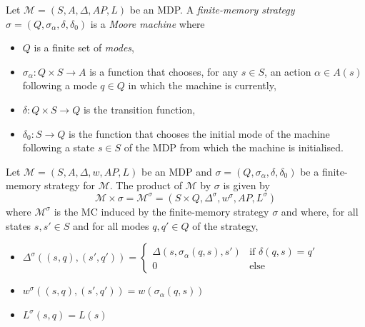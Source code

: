 \begin{definition}
Let $\mathcal{M} = (S, A, \Delta, AP, L)$ be an MDP.
A \textit{finite-memory strategy} $\sigma = (Q, \sigma_\alpha, \delta, \delta_0)$ is a \textit{Moore machine} where
\begin{itemize}
	\item $Q$ is a finite set of \textit{modes},
	\item $\sigma_\alpha: Q \times S \rightarrow A$ is a function that chooses, for any $s \in S$, an action $\alpha \in A(s)$ following a mode $q \in Q$ in which the machine is currently,
	\item $\delta: Q \times S \rightarrow Q$ is the transition function,
	\item $\delta_0: S \rightarrow Q$ is the function that chooses the initial mode of the machine following a state $s \in S$ of the MDP from which the machine is initialised.
\end{itemize}
\end{definition}

\begin{definition}
Let $\mathcal{M} = (S, A, \Delta, w, AP, L)$ be an MDP and $\sigma = (Q, \sigma_\alpha, \delta, \delta_0)$ be a finite-memory strategy for $\mathcal{M}$.
The product of $\mathcal{M}$ by $\sigma$ is given by
\[ \mathcal{M} \times \sigma = \mathcal{M}^\sigma = (S \times Q, \Delta^\sigma, w^\sigma, AP, L^\sigma) \]
where $\mathcal{M}^\sigma$ is the MC induced by the finite-memory strategy $\sigma$ and where,
for all states $s, s' \in S$ and for all modes $q, q' \in Q$ of the strategy,
\begin{itemize}
	\item $\Delta^\sigma((s, q), (s', q')) =
	\begin{cases}
	\Delta(s, \sigma_\alpha(q, s), s') & \text{if } \delta(q, s) = q'\\
	0  & \text{else}
	\end{cases}$
  \item $w^\sigma((s, q), (s', q')) = w(\sigma_\alpha(q, s))$
  \item $L^\sigma(s, q) = L(s)$
\end{itemize}
\end{definition}


